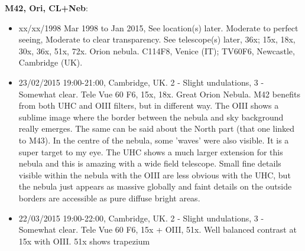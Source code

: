 {\bf M42, Ori, CL+Neb}:
\begin{itemize}
\item xx/xx/1998 Mar 1998 to Jan 2015, See location(s) later. Moderate to perfect seeing, Moderate to clear transparency. See telescope(s) later, 36x; 15x, 18x, 30x, 36x, 51x, 72x. Orion nebula. C114F8, Venice (IT); TV60F6, Newcastle, Cambridge (UK).
\item 23/02/2015 19:00-21:00, Cambridge, UK. 2 - Slight undulations, 3 - Somewhat clear. Tele Vue 60 F6, 15x, 18x. Great Orion Nebula. M42 benefits from both UHC and OIII filters, but in different way. The OIII shows a sublime image where the border between the nebula and sky background really emerges. The same can be said about the North part (that one linked to M43). In the centre of the nebula, some 'waves' were also visible. It is a super target to my eye. The UHC shows a much larger extension for this nebula and this is amazing with a wide field telescope. Small fine details visible within the nebula with the OIII are less obvious with the UHC, but the nebula just appears as massive globally and faint details on the outside borders are accessible as pure diffuse bright areas. 
\item 22/03/2015 19:00-22:00, Cambridge, UK. 2 - Slight undulations, 3 - Somewhat clear. Tele Vue 60 F6, 15x + OIII, 51x. Well balanced contrast at 15x with OIII. 51x shows trapezium
\end{itemize}
